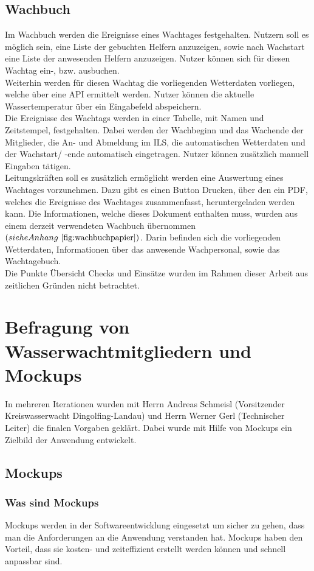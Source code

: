 \documentclass[fontsize=12pt,openright,oneside,paper=a4,BCOR=1cm]{scrbook}
\begin{document}
\subsection{Wachbuch}
Im Wachbuch werden die Ereignisse eines Wachtages festgehalten. Nutzern soll es möglich sein, eine Liste der gebuchten Helfern anzuzeigen, sowie nach Wachstart eine Liste der anwesenden Helfern anzuzeigen. Nutzer können sich für diesen Wachtag ein-, bzw. ausbuchen. \\
Weiterhin werden für diesen Wachtag die vorliegenden Wetterdaten vorliegen, welche über eine API ermittelt werden. Nutzer können die aktuelle Wassertemperatur über ein Eingabefeld abspeichern. \\
Die Ereignisse des Wachtags werden in einer Tabelle, mit Namen und Zeitstempel, festgehalten. Dabei werden der Wachbeginn und das Wachende der Mitglieder, die An- und Abmeldung im ILS, die automatischen Wetterdaten und der Wachstart/ -ende automatisch eingetragen. Nutzer können zusätzlich manuell Eingaben tätigen. \\
Leitungskräften soll es zusätzlich ermöglicht werden eine Auswertung eines Wachtages vorzunehmen. Dazu gibt es einen Button \glqq Drucken\grqq{}, über den ein PDF, welches die Ereignisse des Wachtages zusammenfasst, heruntergeladen werden kann. Die Informationen, welche dieses Dokument enthalten muss, wurden aus einem derzeit verwendeten Wachbuch übernommen $(siehe Anhang ~\ref{fig:wachbuchpapier})$. Darin befinden sich die vorliegenden Wetterdaten, Informationen über das anwesende Wachpersonal, sowie das Wachtagebuch. \\
Die Punkte \glqq Übersicht Checks\grqq{} und \glqq Einsätze\grqq{} wurden im Rahmen dieser Arbeit aus zeitlichen Gründen nicht betrachtet. 

\section{Befragung von Wasserwachtmitgliedern und Mockups}
In mehreren Iterationen wurden mit Herrn Andreas Schmeisl (Vorsitzender Kreiswasserwacht Dingolfing-Landau) und Herrn Werner Gerl (Technischer Leiter) die finalen Vorgaben geklärt. Dabei wurde mit Hilfe von Mockups ein Zielbild der Anwendung entwickelt. 
\subsection{Mockups}
\subsubsection{Was sind Mockups}
Mockups werden in der Softwareentwicklung eingesetzt um sicher zu gehen, dass man die Anforderungen an die Anwendung verstanden hat. Mockups haben den Vorteil, dass sie kosten- und zeiteffizient erstellt werden können und schnell anpassbar sind.
\end{document}
